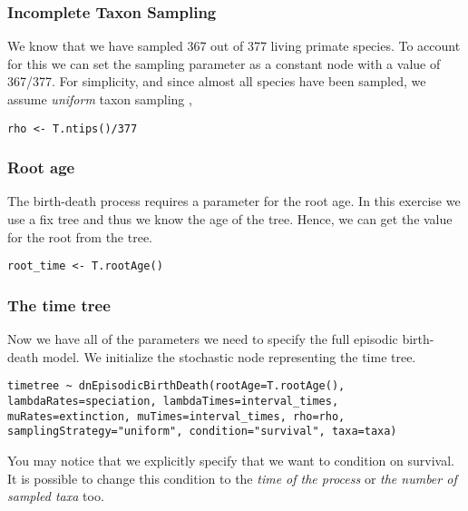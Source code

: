 \subsubsection{Incomplete Taxon Sampling}

We know that we have sampled 367 out of 377 living primate species. 
To account for this we can set the sampling parameter as a constant node with a value of 367/377.
For simplicity, and since almost all species have been sampled, we assume \emph{uniform} taxon sampling \citep{Hoehna2011,Hoehna2014a},
{\tt \begin{snugshade*}
\begin{lstlisting}
rho <- T.ntips()/377
\end{lstlisting}
\end{snugshade*}}


\subsubsection{Root age}

The birth-death process requires a parameter for the root age.
In this exercise we use a fix tree and thus we know the age of the tree.
Hence, we can get the value for the root from the \citet{Springer2012} tree.
{\tt \begin{snugshade*}
\begin{lstlisting}
root_time <- T.rootAge()
\end{lstlisting}
\end{snugshade*}}

\subsubsection{The time tree}

Now we have all of the parameters we need to specify the full episodic birth-death model. 
We initialize the stochastic node representing the time tree.
{\tt \begin{snugshade*}
\begin{lstlisting}
timetree ~ dnEpisodicBirthDeath(rootAge=T.rootAge(), lambdaRates=speciation, lambdaTimes=interval_times, muRates=extinction, muTimes=interval_times, rho=rho, samplingStrategy="uniform", condition="survival", taxa=taxa)
\end{lstlisting}
\end{snugshade*}}
You may notice that we explicitly specify that we want to condition on survival.
It is possible to change this condition to the \emph{time of the process} or \emph{the number of sampled taxa} too.

